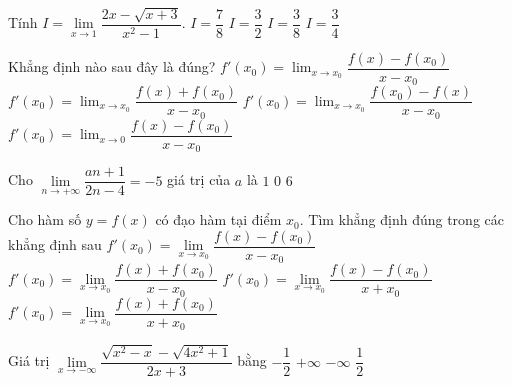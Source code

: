\begin{ex}%
	Tính $I = \lim\limits_{x\to 1} \dfrac{2x-\sqrt{x+3}}{x^2-1}$. 
	\choice 
		{\True $I  = \dfrac{7}{8}$}
		 {$I = \dfrac{3}{2}$}
		 {$I = \dfrac{3}{8}$}
		 {$I = \dfrac{3}{4}$}
\end{ex}

\begin{ex}%
	 Khẳng định nào sau đây là đúng?
	\choice 
		{\True $ f'(x_0)=\displaystyle  \lim_{x\to x_0}{\dfrac{f(x)-f(x_0)}{x-x_0}}
		 $}
		{$ f'(x_0)=\displaystyle  \lim_{x\to x_0}{\dfrac{f(x)+f(x_0)}{x-x_0}}
		$  }
		{$  f'(x_0)=\displaystyle \lim_{x\to x_0}{\dfrac{f(x_0)-f(x)}{x-x_0}}
		 $ }
		{$ f'(x_0)=\displaystyle \lim_{x\to  0}{\dfrac{f(x)-f(x_0)}{x-x_0}}
		$  }
	 \loigiai{
	 }
\end{ex}

\begin{ex}%
	Cho $\lim\limits_{n \to +\infty} \dfrac{an+1}{2n-4}=-5$ giá  trị của $a$ là
		 {$1$}
		{$0$} 
		 {$6$}
\end{ex}

\begin{ex}%
	Cho hàm số $y=f(x)$ có đạo hàm tại điểm $x_0$. Tìm khẳng định đúng trong các  khẳng định sau
	\choice 
		{\True  $f'(x_0)=\lim\limits_{x\to x_0}\dfrac{f(x)-f(x_0)}{x-x_0}$}
		{$f'(x_0)=\lim\limits_{x\to x_0}\dfrac{f(x)+f(x_0)}{x-x_0}$} 
		 {$f'(x_0)=\lim\limits_{x\to x_0}\dfrac{f(x)-f(x_0)}{x+x_0}$}
		{$f'(x_0)=\lim\limits_{x\to  x_0}\dfrac{f(x)+f(x_0)}{x+x_0}$}
\end{ex}

\begin{ex}%
	 Giá trị $\lim\limits_{x\to-\infty} \dfrac{\sqrt{x^2-x}-\sqrt{4x^2+1}}{2x+3}$ bằng
	 \choice
		{$-\dfrac{1}{2}$} 
		{$+\infty$} 
		 {$-\infty$}
		 {\True $\dfrac{1}{2}$}
\end{ex}

